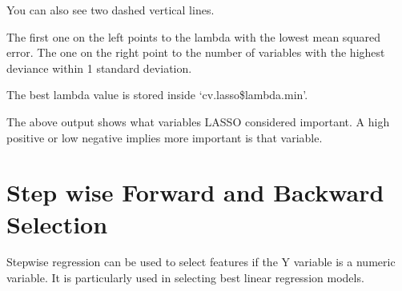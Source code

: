\documentclass[]{book}
\newenvironment{Shaded}{\begin{snugshade}}{\end{snugshade}}
\newcommand{\CharTok}[1]{\textcolor[rgb]{0.31,0.60,0.02}{#1}}
\newcommand{\CommentTok}[1]{\textcolor[rgb]{0.56,0.35,0.01}{\textit{#1}}}
\newcommand{\DataTypeTok}[1]{\textcolor[rgb]{0.13,0.29,0.53}{#1}}
\newcommand{\DecValTok}[1]{\textcolor[rgb]{0.00,0.00,0.81}{#1}}
\newcommand{\FloatTok}[1]{\textcolor[rgb]{0.00,0.00,0.81}{#1}}
\newcommand{\KeywordTok}[1]{\textcolor[rgb]{0.13,0.29,0.53}{\textbf{#1}}}
\newcommand{\NormalTok}[1]{#1}
\newcommand{\OperatorTok}[1]{\textcolor[rgb]{0.81,0.36,0.00}{\textbf{#1}}}
\newcommand{\StringTok}[1]{\textcolor[rgb]{0.31,0.60,0.02}{#1}}
\begin{document}
You can also see two dashed vertical lines.

The first one on the left points to the lambda with the lowest mean squared error. The one on the right point to the number of variables with the highest deviance within 1 standard deviation.

The best lambda value is stored inside `cv.lasso\$lambda.min'.

\begin{Shaded}
\end{Shaded}

The above output shows what variables LASSO considered important. A high positive or low negative implies more important is that variable.

\hypertarget{step-wise-forward-and-backward-selection}{%
\section{Step wise Forward and Backward Selection}\label{step-wise-forward-and-backward-selection}}

Stepwise regression can be used to select features if the Y variable is a numeric variable. It is particularly used in selecting best linear regression models.
\end{document}
